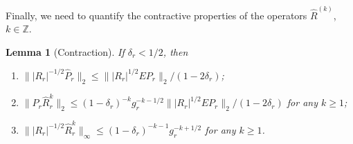 \documentclass[a4paper,11pt]{article} %
\numberwithin{equation}{section}
\theoremstyle{definition}
\theoremstyle{remark}
\theoremstyle{plain}
\newtheorem{lemma}[definition]{Lemma}
\begin{document}
\noindent Finally, we need to quantify the contractive properties of the
operators \( \widehat{R}^{ ( k ) } \), \( k \in \mathbb{Z} \).

\begin{lemma}[Contraction]%
  \label{lem_Contraction}
  If \( \delta_{r} < 1/2 \), then
  \begin{enumerate}[label=(\roman*)]
    \item \(    \| |R_{r}|^{-1/2} \widehat{P}_{r} \|_{2}
            \le \| |R_{r}|^{1/2} E P_{r} \|_{2} / (1 - 2 \delta_{r})
          \);

    \item \(    \| P_{r} \widehat{R}_{r}^{k} \|_{2} 
            \le (1 - \delta_{r})^{-k} g_{r}^{- k - 1/2}  
                \| | R_{r} |^{1/2} E P_{r} \|_{2} / (1 - 2 \delta_{r})
          \) for any \( k \ge 1 \);

    \item \(    \| | R_{r} |^{-1/2} \widehat{R}_{r}^{k}  \|_{ \infty } 
            \le (1 - \delta_{r})^{-k - 1} g_{r}^{-k + 1/2} 
          \) for any \( k \ge 1 \).
  \end{enumerate}
\end{lemma}%
\end{document}
